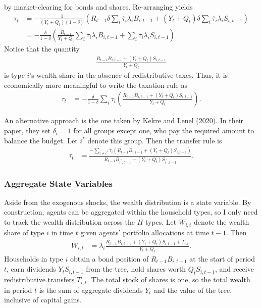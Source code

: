\documentclass[12 pt, oneside]{article}
\theoremstyle{definition}
\theoremstyle{definition}
\theoremstyle{definition}
\begin{document}
by market-clearing for bonds and shares. Re-arranging yields
\begin{align*}
  \tau_t & = -\frac{1}{(Y_t + Q_t)(1 - \delta)}\left(R_{t - 1}\delta\sum_i \overline{\tau}_i \lambda_i B_{i, t - 1} + (Y_t + Q_t)\delta\sum_i \overline{\tau}_i\lambda_iS_{i, t - 1}\right)\\
         & = -\frac{\delta}{1 - \delta}\left(\frac{R_{t - 1}}{Y_t + Q_t}\sum_i \overline{\tau}_i \lambda_i B_{i, t - 1} + \sum_i \overline{\tau}_i\lambda_iS_{i, t - 1}\right)
\end{align*}
Notice that the quantity
\begin{align*}
  \frac{R_{t - 1}B_{i, t - 1} + (Y_t + Q_t)S_{i, t - 1}}{Y_t + Q_t}
\end{align*}
is type $i$'s wealth share in the absence of redistributive taxes. Thus, it is economically more meaningful to write the taxation rule as
\begin{align}\label{eq:common tax rate}
  \tau_t & = -\frac{\delta}{1 - \delta}\sum_i\overline{\tau}_i\left(\frac{R_{t - 1}B_{i, t - 1} + (Y_t + Q_t)S_{i, t - 1}}{Y_t + Q_t}\right).
\end{align}

An alternative approach is the one taken by Kekre and Lenel (2020). In their paper, they set $\delta_i = 1$ for all groups except one, who pay the required amount to balance the budget. Let $i^*$ denote this group. Then the transfer rule is
\begin{align}\label{eq:common tax rate one group clears}
  \tau_t & = \frac{-\sum_{i \neq i^*} \overline{\tau}_i (R_{t - 1}B_{i, t - 1} + (Y_t + Q_t) S_{i, t - 1})}{R_{t - 1}B_{i^*, t - 1} + (Y_t + Q_t)S_{i^*, t - 1} }.
\end{align}



\subsubsection{Aggregate State Variables}
Aside from the exogenous shocks, the wealth distribution is a state variable. By construction, agents can be aggregated within the household types, so I only need to track the wealth distribution across the $H$ types. Let $W_{i, t}$ denote the wealth share of type $i$ in time $t$ given agents' portfolio allocations at time $t - 1$. Then
\begin{align}\label{eq:wealth share defn}
  W_{i, t} & = \lambda_i\frac{R_{t - 1}B_{i, t - 1} + (Y_t + Q_t) S_{i, t - 1} + T_{i, t}}{Y_t + Q_t}.
\end{align}
Households in type $i$ obtain a bond position of $R_{t - 1} B_{i, t - 1}$ at the start of period $t$,
earn dividends $Y_t S_{i, t - 1}$ from the tree, hold shares worth $Q_t S_{i, t - 1}$, and receive redistributive transfers $T_{i, t}$.
The total stock of shares is one, so the total wealth in period $t$ is the sum of aggregate dividends $Y_t$ and the value of the tree, inclusive of capital gains.
\end{document}
